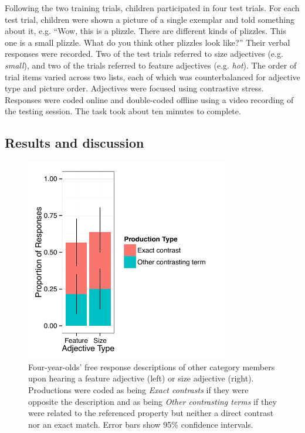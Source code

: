 \documentclass[man]{apa2}
\begin{document}
Following the two training trials, children participated in four test trials.  For each test trial, children were shown a picture of a single exemplar and told something about it, e.g. ``Wow, this is a plizzle. There are different kinds of plizzles. This one is a small plizzle.  What do you think other plizzles look like?'' Their verbal responses were recorded.  Two of the test trials referred to size adjectives (e.g. \emph{small}), and two of the trials referred to feature adjectives (e.g. \emph{hot}).  The order of trial items varied across two lists, each of which was counterbalanced for adjective type and picture order.  Adjectives were focused using contrastive stress. Responses were coded online and double-coded offline using a video recording of the testing session.  The task took about ten minutes to complete. 

\subsection{Results and discussion}

\begin{figure}[t] 
  \begin{center} 
    \includegraphics[width=3.5in]{figures/expt3.pdf} 
    \caption{\label{fig:freeResponse} Four-year-olds' free response descriptions of other category members upon hearing a feature adjective (left) or size adjective (right).  Productions were coded as being \emph{Exact contrasts} if they were opposite the description and as being \emph{Other contrasting terms} if they were related to the referenced property but neither a direct contrast nor an exact match. Error bars show 95\% confidence intervals. }
  \end{center} 
\end{figure}
\end{document}
